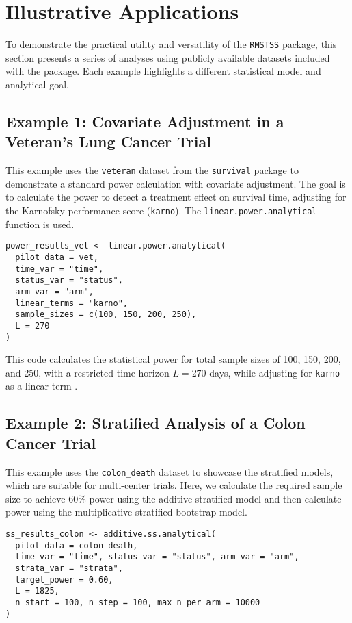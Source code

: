 \documentclass[article]{jss}
\begin{document}
\section{Illustrative Applications}
To demonstrate the practical utility and versatility of the \texttt{RMSTSS} package, this section presents a series of analyses using publicly available datasets included with the package. Each example highlights a different statistical model and analytical goal.

\subsection{Example 1: Covariate Adjustment in a Veteran's Lung Cancer Trial}
This example uses the \texttt{veteran} dataset from the \texttt{survival} package to demonstrate a standard power calculation with covariate adjustment. The goal is to calculate the power to detect a treatment effect on survival time, adjusting for the Karnofsky performance score (\texttt{karno}). The \texttt{linear.power.analytical} function is used.

\begin{lstlisting}
power_results_vet <- linear.power.analytical(
  pilot_data = vet,
  time_var = "time",
  status_var = "status",
  arm_var = "arm",
  linear_terms = "karno",
  sample_sizes = c(100, 150, 200, 250),
  L = 270
)
\end{lstlisting}

This code calculates the statistical power for total sample sizes of 100, 150, 200, and 250, with a restricted time horizon $L=270$ days, while adjusting for \texttt{karno} as a linear term \cite{[1]}.

\subsection{Example 2: Stratified Analysis of a Colon Cancer Trial}
This example uses the \texttt{colon\_death} dataset to showcase the stratified models, which are suitable for multi-center trials. Here, we calculate the required sample size to achieve 60\% power using the additive stratified model and then calculate power using the multiplicative stratified bootstrap model.

\begin{lstlisting}
ss_results_colon <- additive.ss.analytical(
  pilot_data = colon_death,
  time_var = "time", status_var = "status", arm_var = "arm", 
  strata_var = "strata",
  target_power = 0.60,
  L = 1825,
  n_start = 100, n_step = 100, max_n_per_arm = 10000
)
\end{lstlisting}
\end{document}
